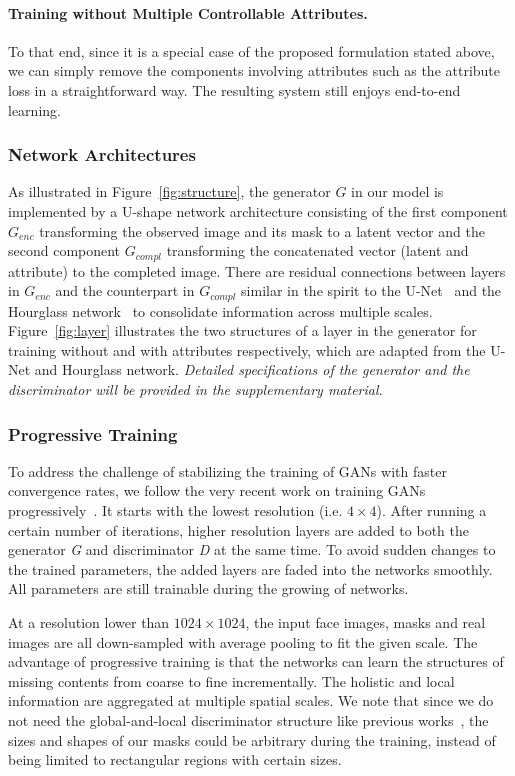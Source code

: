 \documentclass[acmtog,timestamp]{acmart}
\begin{document}
\paragraph{Training without Multiple Controllable Attributes.} To that end, since it is a special case of the proposed formulation stated above, we can simply remove the components involving attributes such as the attribute loss in a straightforward way. The resulting system still enjoys end-to-end learning.   

\subsubsection{Network Architectures} As illustrated in Figure~\ref{fig:structure}, the generator $G$ in our model is implemented by a U-shape network architecture consisting of the first component $G_{enc}$ transforming the observed image and its mask to a latent vector and the second component $G_{compl}$ transforming the concatenated vector (latent and attribute) to the completed image. There are residual connections between layers in $G_{enc}$ and the counterpart in $G_{compl}$ similar in the spirit to the U-Net~\cite{ronneberger2015u} and the Hourglass network~\cite{newell2016stacked} to consolidate information across multiple scales. Figure~\ref{fig:layer} illustrates the two structures of a layer in the generator for training without and with attributes respectively, which are adapted from the U-Net and Hourglass network. \textit{Detailed specifications of the generator and the discriminator will be provided in the supplementary material.}\subsubsection{Progressive Training}
To address the challenge of stabilizing the training of GANs with faster convergence rates, we follow the very recent work on training GANs progressively~\cite{karras2017progressive}. It  starts with the lowest resolution (i.e. $4\times4$). After running a certain number of iterations, higher resolution layers are added to both the generator \textit{G} and discriminator \textit{D} at the same time. To avoid sudden changes to the trained parameters, the added layers are faded into the networks smoothly. All parameters are still trainable during the growing of networks. %

At a resolution lower than $1024\times1024$, the input face images, masks and real images are all down-sampled with average pooling to fit the given scale. The advantage of  progressive training  is that the networks can learn the structures of missing contents from coarse to fine incrementally. The holistic and local information are aggregated at multiple spatial scales. We note that since we do not need the global-and-local discriminator structure like previous works~\cite{iizuka2017globally,li2017generative}, the sizes and shapes of our masks could be arbitrary during the training, instead of being limited to rectangular regions with certain sizes. 
\end{document}
